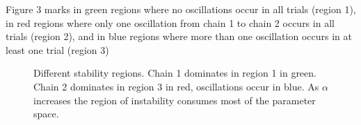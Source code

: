 \documentclass[10pt, preprint]{aastex}
\begin{document}
Figure 3 marks in green regions where no oscillations occur in all trials (region 1), in red regions where only one oscillation from chain 1 to chain 2 occurs in all trials (region 2), and in blue regions where more than one oscillation occurs in at least one trial (region 3)
\begin{figure}
	\centering
	\qquad
	\qquad
	\qquad
	\qquad
	\caption{Different stability regions.  Chain 1 dominates in region 1 in green.  Chain 2 dominates in region 3 in red, oscillations occur in blue.  As $\alpha$ increases the region of instability consumes most of the parameter space.}
\end{figure}
\end{document}
